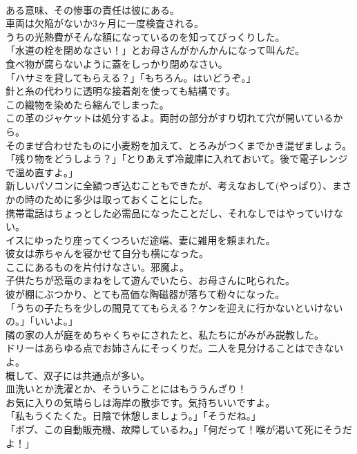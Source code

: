 \documentclass[8pt]{extreport}
\begin{document}
\begin{CJK}{UTF8}{min}
\\	ある意味、その惨事の責任は彼にある。
\\	車両は欠陥がないか3ヶ月に一度検査される。
\\	うちの光熱費がそんな額になっているのを知ってびっくりした。
\\	「水道の栓を閉めなさい！」とお母さんがかんかんになって叫んだ。
\\	食べ物が腐らないように蓋をしっかり閉めなさい。
\\	「ハサミを貸してもらえる？」「もちろん。はいどうぞ。」
\\	針と糸の代わりに透明な接着剤を使っても結構です。
\\	この織物を染めたら縮んでしまった。
\\	この革のジャケットは処分するよ。両肘の部分がすり切れて穴が開いているから。
\\	そのまぜ合わせたものに小麦粉を加えて、とろみがつくまでかき混ぜましょう。
\\	「残り物をどうしよう？」「とりあえず冷蔵庫に入れておいて。後で電子レンジで温め直すよ。」
\\	新しいパソコンに全額つぎ込むこともできたが、考えなおして(やっぱり）、まさかの時のために多少は取っておくことにした。
\\	携帯電話はちょっとした必需品になったことだし、それなしではやっていけない。
\\	イスにゆったり座ってくつろいだ途端、妻に雑用を頼まれた。
\\	彼女は赤ちゃんを寝かせて自分も横になった。
\\	ここにあるものを片付けなさい。邪魔よ。
\\	子供たちが恐竜のまねをして遊んでいたら、お母さんに叱られた。
\\	彼が棚にぶつかり、とても高価な陶磁器が落ちて粉々になった。
\\	「うちの子たちを少しの間見ててもらえる？ケンを迎えに行かないといけないの。」「いいよ。」
\\	隣の家の人が庭をめちゃくちゃにされたと、私たちにがみがみ説教した。
\\	ドリーはあらゆる点でお姉さんにそっくりだ。二人を見分けることはできないよ。
\\	概して、双子には共通点が多い。
\\	皿洗いとか洗濯とか、そういうことにはもううんざり！
\\	お気に入りの気晴らしは海岸の散歩です。気持ちいいですよ。
\\	「私もうくたくた。日陰で休憩しましょう。」「そうだね。」
\\	「ボブ、この自動販売機、故障しているわ。」「何だって！喉が渇いて死にそうだよ！」

\end{CJK}
\end{document}
